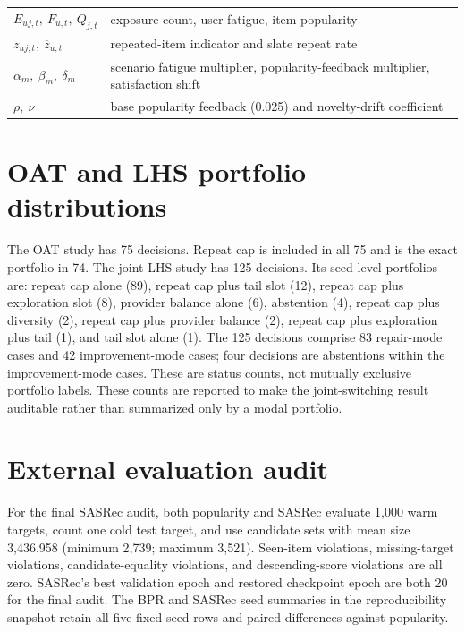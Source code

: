 \documentclass[pdflatex,sn-mathphys-num]{sn-jnl}
\theoremstyle{thmstyleone}
\theoremstyle{thmstyletwo}
\theoremstyle{thmstylethree}
\begin{document}
\begin{appendices}
\begin{table}[h]
\begin{tabular}{@{}ll@{}}
$E_{uj,t},\ F_{u,t},\ Q_{j,t}$ & exposure count, user fatigue, item popularity\\
$z_{uj,t},\ \overline z_{u,t}$ & repeated-item indicator and slate repeat rate\\
$\alpha_m,\ \beta_m,\ \delta_m$ & scenario fatigue multiplier, popularity-feedback multiplier, satisfaction shift\\
$\rho,\ \nu$ & base popularity feedback (0.025) and novelty-drift coefficient\\
\bottomrule
\end{tabular}
\end{table}

\section{OAT and LHS portfolio distributions}\label{app:calibration}
The OAT study has 75 decisions. Repeat cap is included in all 75 and is the exact portfolio in 74. The joint LHS study has 125 decisions. Its seed-level portfolios are: repeat cap alone (89), repeat cap plus tail slot (12), repeat cap plus exploration slot (8), provider balance alone (6), abstention (4), repeat cap plus diversity (2), repeat cap plus provider balance (2), repeat cap plus exploration plus tail (1), and tail slot alone (1). The 125 decisions comprise 83 repair-mode cases and 42 improvement-mode cases; four decisions are abstentions within the improvement-mode cases. These are status counts, not mutually exclusive portfolio labels. These counts are reported to make the joint-switching result auditable rather than summarized only by a modal portfolio.

\section{External evaluation audit}\label{app:audit}
For the final SASRec audit, both popularity and SASRec evaluate 1,000 warm targets, count one cold test target, and use candidate sets with mean size 3,436.958 (minimum 2,739; maximum 3,521). Seen-item violations, missing-target violations, candidate-equality violations, and descending-score violations are all zero. SASRec's best validation epoch and restored checkpoint epoch are both 20 for the final audit. The BPR and SASRec seed summaries in the reproducibility snapshot retain all five fixed-seed rows and paired differences against popularity.


\end{appendices}
\end{document}
